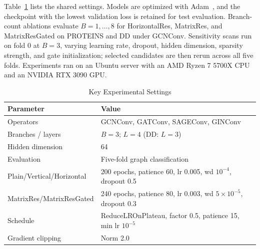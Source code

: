 Table~\ref{tab:hyperparams} lists the shared settings. Models are optimized with
Adam~\cite{kingma2014adam}, and the checkpoint with the lowest validation loss
is retained for test evaluation.
Branch-count ablations
evaluate \(B=1,\ldots,8\) for HorizontalRes, MatrixRes, and MatrixResGated on
PROTEINS and DD under GCNConv. Sensitivity scans run on fold 0 at \(B=3\),
varying learning rate, dropout, hidden dimension, sparsity strength, and gate
initialization; selected candidates are then rerun across all five folds.
Experiments ran on an Ubuntu server with an AMD Ryzen 7 5700X CPU and an NVIDIA
RTX 3090 GPU.

\begin{table}[!t]
\centering
\caption{Key Experimental Settings}
\label{tab:hyperparams}
\footnotesize
\begin{tabular}{@{}p{}p{}@{}}
\toprule
Parameter & Value \\
\midrule
Operators & GCNConv, GATConv, SAGEConv, GINConv \\
Branches / layers & \(B=3\); \(L=4\) (DD: \(L=3\)) \\
Hidden dimension & 64 \\
Evaluation & Five-fold graph classification \\
Plain/Vertical/Horizontal & 200 epochs, patience 60, lr 0.005, wd \(10^{-4}\), dropout 0.5 \\
MatrixRes/MatrixResGated & 240 epochs, patience 80, lr 0.003, wd \(5\times10^{-5}\), dropout 0.3 \\
Schedule & ReduceLROnPlateau, factor 0.5, patience 15, min lr \(10^{-5}\) \\
Gradient clipping & Norm 2.0 \\
\bottomrule
\end{tabular}
\end{table}
